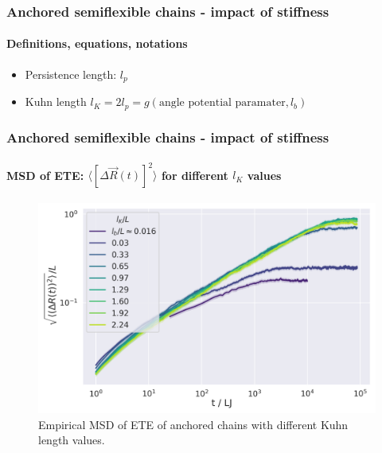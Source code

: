 \documentclass[handout]{beamer}
\newcommand{\mean}[1]{\langle #1 \rangle}
\begin{document}

\begin{frame}
    \frametitle{Anchored semiflexible chains - impact of stiffness}
    \framesubtitle{Definitions, equations, notations}
    \begin{itemize}
        \item Persistence length: $l_p$
        \item Kuhn length $l_K=2l_p=g(\text{angle potential paramater}, l_b)$
    \end{itemize}
\end{frame}


\begin{frame}
    \frametitle{Anchored semiflexible chains - impact of stiffness}
    \framesubtitle{MSD of ETE: $\mean{[\Delta \vec{R}(t)]^2}$ for different $l_K$ values}

    \begin{figure}
        \centering
        \includegraphics[width=\columnwidth,trim={0cm 0cm 0cm 0.0cm},clip]{4-exp-delta_R-bare-log.png}
        \caption{Empirical MSD of ETE of anchored chains with different Kuhn length values.}
        \label{fig:msd_anchored_l_K}
    \end{figure}
\end{frame}

\end{document}

